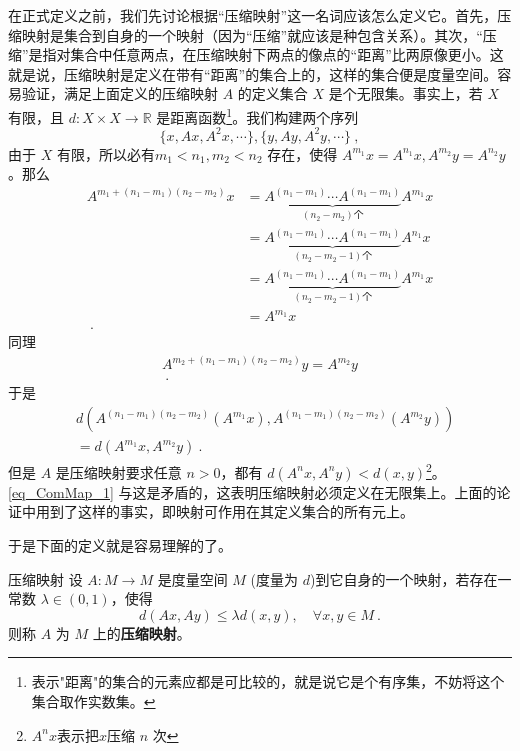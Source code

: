 在正式定义之前，我们先讨论根据“压缩映射”这一名词应该怎么定义它。首先，压缩映射是集合到自身的一个映射（因为“压缩”就应该是种包含关系）。其次，“压缩”是指对集合中任意两点，在压缩映射下两点的像点的“距离”比两原像更小。这就是说，压缩映射是定义在带有“距离”的集合上的，这样的集合便是度量空间。容易验证，满足上面定义的压缩映射 $A$ 的定义集合 $X$ 是个无限集。事实上，若 $X$ 有限，且 $d:X\times X\rightarrow \mathbb R$ 是距离函数\footnote{表示"距离"的集合的元素应都是可比较的，就是说它是个有序集，不妨将这个集合取作实数集。}。我们构建两个序列
\begin{equation}
\{x,Ax,A^2x,\cdots\},\{y,Ay,A^2y,\cdots\}~,
\end{equation}
由于 $X$ 有限，所以必有$m_1<n_1,m_2<n_2$ 存在，使得 $A^{m_1}x=A^{n_1}x,A^{m_2}y=A^{n_2}y$ 。那么
\begin{equation}
\begin{aligned}
A^{m_1+(n_1-m_1)(n_2-m_2)}x&=\underbrace{A^{(n_1-m_1)}\cdots A^{(n_1-m_1)}}_{(n_2-m_2)\text{个}}A^{m_1}x\\
&=\underbrace{A^{(n_1-m_1)}\cdots A^{(n_1-m_1)}}_{(n_2-m_2-1)\text{个}}A^{n_1}x\\
&=\underbrace{A^{(n_1-m_1)}\cdots A^{(n_1-m_1)}}_{(n_2-m_2-1)\text{个}}A^{m_1}x\\
&=A^{m_1}x\\~.
\end{aligned}
\end{equation}
同理
\begin{equation}
\begin{aligned}
A^{m_2+(n_1-m_1)(n_2-m_2)}y=A^{m_2}y\\~.
\end{aligned}
\end{equation}
于是
\begin{equation}\label{eq_ComMap_1}
\begin{aligned}
&d(A^{(n_1-m_1)(n_2-m_2)}(A^{m_1}x),A^{(n_1-m_1)(n_2-m_2)}(A^{m_2}y))\\
&=d(A^{m_1}x,A^{m_2}y)~.
\end{aligned}
\end{equation}
但是 $A$ 是压缩映射要求任意 $n>0$，都有 $d(A^n x,A^n y)<d(x,y)$\footnote{$A^n x$表示把$x$压缩 $n$ 次}。\autoref{eq_ComMap_1} 与这是矛盾的，这表明压缩映射必须定义在无限集上。上面的论证中用到了这样的事实，即映射可作用在其定义集合的所有元上。

于是下面的定义就是容易理解的了。
\begin{definition}{压缩映射}
设 $A:M\rightarrow M$ 是度量空间 $M$ (度量为 $d$)到它自身的一个映射，若存在一常数 $\lambda\in(0,1)$，使得
\begin{equation}
d(Ax,Ay)\leq \lambda d(x,y),\quad \forall x,y\in M~.
\end{equation}
 则称 $A$ 为 $M$ 上的\textbf{压缩映射}。
\end{definition}
